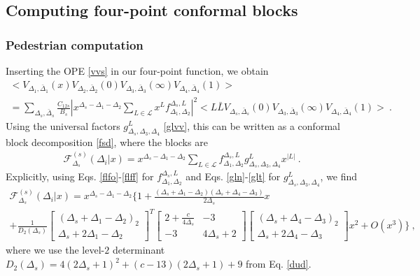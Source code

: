\documentclass[12pt, a4paper, notitlepage, twoside]{report}
\numberwithin{equation}{section}
\theoremstyle{break}
\begin{document}
\subsection{Computing four-point conformal blocks}

\subsubsection{Pedestrian computation}

Inserting the OPE \eqref{vvs} in our four-point function, we obtain
\begin{multline}
 \Big< V_{\Delta_1,\bar\Delta_1}(x) V_{\Delta_2,\bar\Delta_2}(0)V_{\Delta_3,\bar\Delta_3}(\infty)V_{\Delta_4,\bar\Delta_4}(1)\Big>
 \\
 = 
 \sum_{\Delta_s,\bar\Delta_s} \frac{C_{12s}}{B_s} 
 \left| x^{\Delta_s-\Delta_1-\Delta_2}\sum_{L\in\mathcal{L}} x^Lf^{\Delta_s,L}_{\Delta_1,\Delta_2} \right|^2
 \Big< L\bar L V_{\Delta_s,\bar\Delta_s}(0) V_{\Delta_3,\bar\Delta_3}(\infty) V_{\Delta_4,\bar\Delta_4}(1) \Big>\ .
 \label{4ope}
\end{multline}
Using the universal factors $g^L_{\Delta_s,\Delta_3,\Delta_4}$ \eqref{glvv}, this can be written as a conformal block decomposition \eqref{fsd}, where the blocks are 
\begin{align}
 \mathcal{F}^{(s)}_{\Delta_s}(\Delta_i|x) = x^{\Delta_s-\Delta_1-\Delta_2}\sum_{L\in\mathcal{L}} f_{\Delta_1,\Delta_2}^{\Delta_s,L} g^{L}_{\Delta_s,\Delta_3,\Delta_4}x^{|L|}\ .
\label{gsd}
\end{align}
Explicitly, using Eqs. \eqref{flfo}-\eqref{flff} for $f_{\Delta_1,\Delta_2}^{\Delta_s,L}$ and Eqs. \eqref{gln}-\eqref{glt} for $g^L_{\Delta_s,\Delta_3,\Delta_4}$, we find 
\begin{multline}
 \mathcal{F}^{(s)}_{\Delta_s}(\Delta_i|x) 
= x^{\Delta_s - \Delta_1 - \Delta_2}\Bigg\{ 1 
+ \frac{(\Delta_s+\Delta_1-\Delta_2)(\Delta_s+\Delta_4-\Delta_3)}{2\Delta_s} x  
\\
+ \frac{1}{D_2(\Delta_s)}
\begin{bmatrix} (\Delta_s+\Delta_1-\Delta_2)_2 \\ \Delta_s+2\Delta_1-\Delta_2 \end{bmatrix}^T
\begin{bmatrix} 2+\frac{c}{4\Delta_s} & -3 \\ -3 & 4\Delta_s+2 \end{bmatrix}
\begin{bmatrix} (\Delta_s+\Delta_4-\Delta_3)_2 \\ \Delta_s+2\Delta_4-\Delta_3 \end{bmatrix}
 x^2 + O(x^3)\Bigg\}\ ,
 \label{eq:fsexp}
\end{multline}
where we use the level-$2$ determinant $D_2(\Delta_s)=4(2\Delta_s+1)^2 +(c-13)(2\Delta_s+1) +9$ from Eq. \eqref{dud}.
\end{document}
